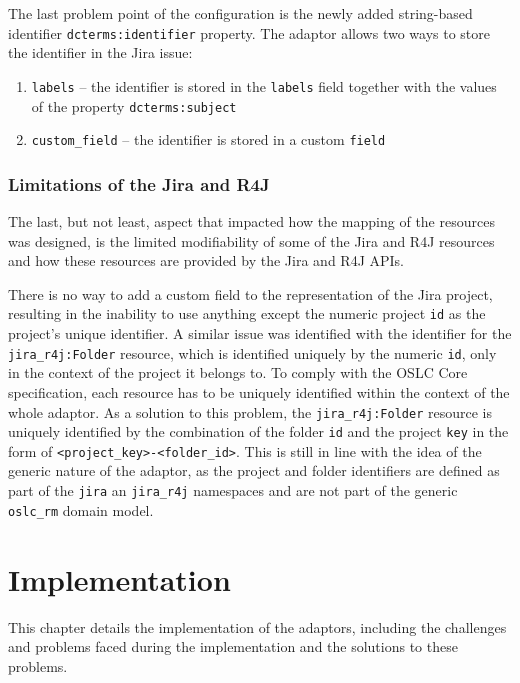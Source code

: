 The last problem point of the configuration is the newly added string-based identifier \texttt{dcterms:identifier} property. The adaptor allows two ways to store the identifier in the Jira issue:

\begin{enumerate}
  \item \texttt{labels} -- the identifier is stored in the \texttt{labels} field together with the values of the property \texttt{dcterms:subject}
  \item \texttt{custom\_field} -- the identifier is stored in a custom \texttt{field}
\end{enumerate}

\subsection*{Limitations of the Jira and R4J}
The last, but not least, aspect that impacted how the mapping of the resources was designed, is the limited modifiability of some of the Jira and R4J resources and how these resources are provided by the Jira and R4J APIs.

There is no way to add a custom field to the representation of the Jira project, resulting in the inability to use anything except the numeric project \texttt{id} as the project's unique identifier. A similar issue was identified with the identifier for the \texttt{jira\_r4j:Folder} resource, which is identified uniquely by the numeric \texttt{id}, only in the context of the project it belongs to. To comply with the OSLC Core specification, each resource has to be uniquely identified within the context of the whole adaptor. As a solution to this problem, the \texttt{jira\_r4j:Folder} resource is uniquely identified by the combination of the folder \texttt{id} and the project \texttt{key} in the form of \texttt{<project\_key>-<folder\_id>}. This is still in line with the idea of the generic nature of the adaptor, as the project and folder identifiers are defined as part of the \texttt{jira} an \texttt{jira\_r4j} namespaces and are not part of the generic \texttt{oslc\_rm} domain model.


\chapter{Implementation}
\label{chapter:implementation}
This chapter details the implementation of the adaptors, including the challenges and problems faced during the implementation and the solutions to these problems.

